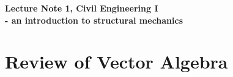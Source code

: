 \documentclass[10pt,a4j]{jarticle}
\newlength{\minitwocolumn}
\begin{document}
\newcommand{\fat}[1]{\mbox{\boldmath $#1$}}
\newcommand{\D}{\partial}
\newcommand{\w}{\omega}
\newcommand{\ga}{\alpha}
\newcommand{\gb}{\beta}
\newcommand{\gx}{\xi}
\newcommand{\gz}{\zeta}
\newcommand{\vhat}[1]{\hat{\fat{#1}}}
\newcommand{\spc}{\vspace{0.7\baselineskip}}
\newcommand{\halfspc}{\vspace{0.3\baselineskip}}

\newcommand{\twofig}[2]
 {
   \begin{figure}
     \begin{minipage}[t]{\minitwocolumn}
         \begin{center}   #1
         \end{center}
     \end{minipage}
         \hspace{\columnsep}
     \begin{minipage}[t]{\minitwocolumn}
         \begin{center} #2
         \end{center}
     \end{minipage}
   \end{figure}
 }
\begin{center}
	{\Large \bf Lecture Note 1, Civil Engineering I \\ - an introduction to structural mechanics}  
\end{center}
\section{Review of Vector Algebra}
\end{document}
